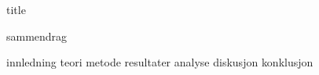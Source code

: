 



{title}
\newpage

\cleardoublepage
\tableofcontents
\newpage

{sammendrag}


{innledning}
{teori}
{metode}
{resultater}
{analyse}
{diskusjon}
{konklusjon}

\newpage

\printbibliography[heading=bibintoc]
\listoffigures

